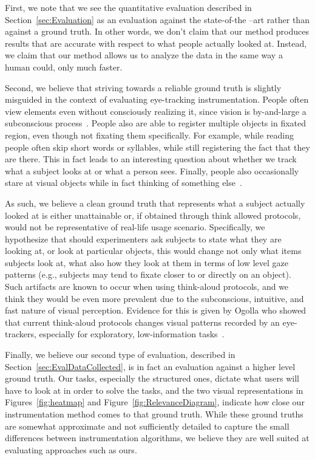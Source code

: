 First, we note that we see the quantitative evaluation described in Section~\ref{sec:Evaluation} as an evaluation against the state-of-the –art rather than against a ground truth. In other words, we don't claim that our method produces results that are accurate with respect to what people actually looked at. Instead, we claim that our method allows us to analyze the data in the same way a human could, only much faster. 

Second, we believe that striving towards a reliable ground truth is slightly misguided in the context of evaluating eye-tracking instrumentation.  People often view elements even without consciously realizing it, since vision is by-and-large a subconscious process~\cite{duchowski2007eye}. People also are able to register multiple objects in fixated region, even though not fixating them specifically. For example, while reading people often skip short words or syllables, while still registering the fact that they are there. This in fact leads to an interesting question about whether we track what a subject looks at or what a person sees. Finally, people also occasionally stare at visual objects while in fact thinking of something else~\cite{duchowski2007eye}. 


As such, we believe a clean ground truth that represents what a subject actually looked at is either unattainable or, if obtained through think allowed protocols, would not be representative of real-life usage scenario. Specifically, we hypothesize that should experimenters ask subjects to state what they are looking at, or look at particular objects, this would change not only what items subjects look at, what also how they look at them in terms of low level gaze patterns (e.g., subjects may tend to fixate closer to or directly on an object). Such artifacts are known to occur when using think-aloud protocols, and we think they would be even more prevalent due to the subconscious, intuitive, and fast nature of visual perception.  Evidence for this is given by Ogolla who showed that current think-aloud protocols changes visual patterns recorded by an eye-trackers, especially for exploratory, low-information tasks~\cite{ogolla2011usability}.
 

Finally, we believe our second type of evaluation, described in Section~\ref{sec:EvalDataCollected}, is in fact an evaluation against a higher level ground truth. Our tasks, especially the structured ones, dictate what users will have to look at in order to solve the tasks, and the two visual representations in Figures~\ref{fig:heatmap} and Figure~\ref{fig:RelevanceDiagram}, indicate how close our instrumentation method comes to that ground truth. While these ground truths are somewhat approximate and not sufficiently detailed to capture the small differences between instrumentation algorithms, we believe they are well suited at evaluating approaches such as ours.   

